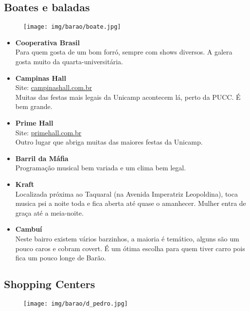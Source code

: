 \subsection{Boates e baladas}

\begin{figure}[h!]
  \centering
  \texttt{[image: img/barao/boate.jpg]}
\end{figure}

\begin{itemize}
\item \textbf{Cooperativa Brasil}
  \\Para quem gosta de um bom forró, sempre com shows diversos. A galera gosta
  muito da quarta-universitária.

\item \textbf{Campinas Hall}
  \\Site: \url{campinashall.com.br}
  \\Muitas das festas mais legais da Unicamp acontecem lá, perto da PUCC. É bem
  grande.

\item \textbf{Prime Hall}
  \\Site: \url{primehall.com.br}
  \\Outro lugar que abriga muitas das maiores festas da Unicamp.

\item \textbf{Barril da Máfia}
  \\Programação musical bem variada e um clima bem legal.

\item \textbf{Kraft}
  \\Localizada próxima ao Taquaral (na Avenida Imperatriz Leopoldina), toca
  musica psi a noite toda e fica aberta até quase o amanhecer. Mulher entra de
  graça até a meia-noite.

\item \textbf{Cambuí}
  \\Neste bairro existem vários barzinhos, a maioria é temático, alguns são um
  pouco caros e cobram covert. É um ótima escolha para quem tiver carro pois
  fica um pouco longe de Barão.
\end{itemize}

\subsection{Shopping Centers}

\begin{figure}[h!]
  \centering
  \texttt{[image: img/barao/d\_pedro.jpg]}
\end{figure}

